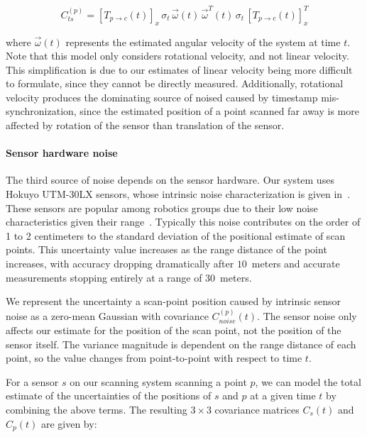 \documentclass[12pt,onecolumn,oneside]{book}
\begin{document}
\begin{equation}
C^{(p)}_{ts} = \left[ T_{p\rightarrow c}(t) \right]_x \, \sigma_{t} \, \vec{\omega}(t) \, \vec{\omega}^T(t) \, \sigma_{t} \, \left[ T_{p\rightarrow c}(t) \right]_x^T
\end{equation}

where $\vec{\omega}(t)$ represents the estimated angular velocity of the system at time $t$. Note that this model only considers rotational velocity, and not linear velocity.  This simplification is due to our estimates of linear velocity being more difficult to formulate, since they cannot be directly measured.  Additionally, rotational velocity produces the dominating source of noised caused by timestamp mis-synchronization, since the estimated position of a point scanned far away is more affected by rotation of the sensor than translation of the sensor.

\paragraph*{Sensor hardware noise}
The third source of noise depends on the sensor hardware.  Our system uses Hokuyo UTM-30LX sensors, whose intrinsic noise characterization is given in~\cite{Pomerleau12}.  These sensors are popular among robotics groups due to their low noise characteristics given their range~\cite{GTSAM14}.  Typically this noise contributes on the order of 1 to 2 centimeters to the standard deviation of the positional estimate of scan points.  This uncertainty value increases as the range distance of the point increases, with accuracy dropping dramatically after $10$~meters and accurate measurements stopping entirely at a range of $30$~meters.  

We represent the uncertainty a scan-point position caused by intrinsic sensor noise as a zero-mean Gaussian with covariance $C^{(p)}_{noise}(t)$.  The sensor noise only affects our estimate for the position of the scan point, not the position of the sensor itself.  The variance magnitude is dependent on the range distance of each point, so the value changes from point-to-point with respect to time $t$.

For a sensor $s$ on our scanning system scanning a point $p$, we can model the total estimate of the uncertainties of the positions of $s$ and $p$ at a given time $t$ by combining the above terms.  The resulting $3 \times 3$ covariance matrices $C_s(t)$ and $C_p(t)$ are given by:
\end{document}
